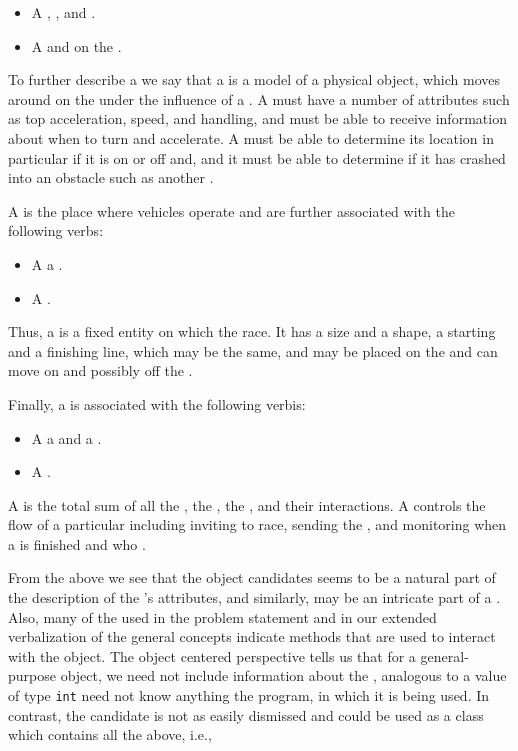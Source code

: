 \begin{description}
\begin{description}
  \begin{itemize}
  \item A    , , and . 
  \item A   and on the .
  \end{itemize}
  To further describe a  we say that a  is a model of a physical object, which moves around on the  under the influence of a . A  must have a number of attributes such as top acceleration, speed, and handling, and must be able to receive information about when to turn and accelerate. A  must be able to determine its location in particular if it is on or off  and, and it must be able to determine if it has crashed into an obstacle such as another .
\item[\noun{track}] A  is the place where vehicles operate and are further associated with the following verbs:
  \begin{itemize}
  \item A   a .
  \item A   .
  \end{itemize}
  Thus, a  is a fixed entity on which the  race. It has a size and a shape, a starting and a finishing line, which may be the same, and  may be placed on the  and can move on and possibly off the .
\item[\noun{game}] Finally, a  is associated with the following verbis:
  \begin{itemize}
  \item A   a  and a . 
  \item A   .
  \end{itemize}
  A  is the total sum of all the , the , the , and their interactions. A  controls the flow of a particular  including inviting  to race, sending the , and monitoring when a  is finished and who .
\end{description}
From the above we see that the object candidates  seems to be a natural part of the description of the 's attributes, and similarly,  may be an intricate part of a . Also, many of the  used in the problem statement and in our extended verbalization of the general concepts indicate methods that are used to interact with the object. The object centered perspective tells us that for a general-purpose  object, we need not include information about the , analogous to a value of type \lstinline|int| need not know anything the program, in which it is being used. In contrast, the candidate  is not as easily dismissed and could be used as a class which contains all the above, i.e.,


\end{description}
